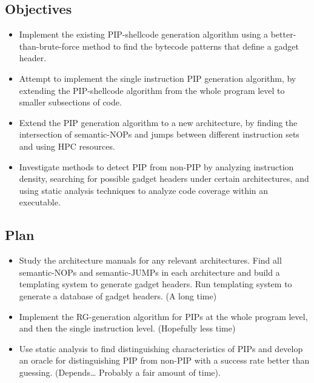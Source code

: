 \documentclass{article}
\begin{document}
\subsection{Objectives}

\begin{itemize}
\item
  Implement the existing PIP-shellcode generation algorithm using a
  better-than-brute-force method to find the bytecode patterns that
  define a gadget header.
\item
  Attempt to implement the single instruction PIP generation algorithm,
  by extending the PIP-shellcode algorithm from the whole program level
  to smaller subsections of code.
\item
  Extend the PIP generation algorithm to a new architecture, by finding
  the intersection of semantic-NOPs and jumps between different
  instruction sets and using HPC resources.
\item
  Investigate methods to detect PIP from non-PIP by analyzing
  instruction density, searching for possible gadget headers under
  certain architectures, and using static analysis techniques to analyze
  code coverage within an executable.
\end{itemize}
\subsection{Plan}

\begin{itemize}
\item
  Study the architecture manuals for any relevant architectures. Find
  all semantic-NOPs and semantic-JUMPs in each architecture and build a
  templating system to generate gadget headers. Run templating system to
  generate a database of gadget headers. (A long time)
\item
  Implement the RG-generation algorithm for PIPs at the whole program
  level, and then the single instruction level. (Hopefully less time)
\item
  Use static analysis to find distinguishing characteristics of PIPs and
  develop an oracle for distinguishing PIP from non-PIP with a success
  rate better than guessing. (Depends\ldots{} Probably a fair amount of
  time).
\end{itemize}
\end{document}

